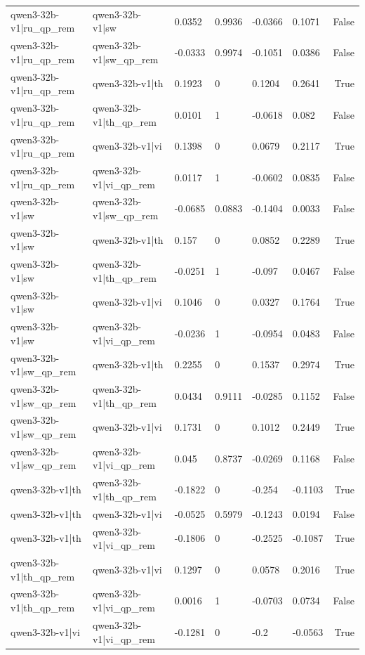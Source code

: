 \begin{table}
\begin{tabular}{llllllr}
qwen3-32b-v1|ru_qp_rem & qwen3-32b-v1|sw & 0.0352 & 0.9936 & -0.0366 & 0.1071 & False \\
qwen3-32b-v1|ru_qp_rem & qwen3-32b-v1|sw_qp_rem & -0.0333 & 0.9974 & -0.1051 & 0.0386 & False \\
qwen3-32b-v1|ru_qp_rem & qwen3-32b-v1|th & 0.1923 & 0 & 0.1204 & 0.2641 & True \\
qwen3-32b-v1|ru_qp_rem & qwen3-32b-v1|th_qp_rem & 0.0101 & 1 & -0.0618 & 0.082 & False \\
qwen3-32b-v1|ru_qp_rem & qwen3-32b-v1|vi & 0.1398 & 0 & 0.0679 & 0.2117 & True \\
qwen3-32b-v1|ru_qp_rem & qwen3-32b-v1|vi_qp_rem & 0.0117 & 1 & -0.0602 & 0.0835 & False \\
qwen3-32b-v1|sw & qwen3-32b-v1|sw_qp_rem & -0.0685 & 0.0883 & -0.1404 & 0.0033 & False \\
qwen3-32b-v1|sw & qwen3-32b-v1|th & 0.157 & 0 & 0.0852 & 0.2289 & True \\
qwen3-32b-v1|sw & qwen3-32b-v1|th_qp_rem & -0.0251 & 1 & -0.097 & 0.0467 & False \\
qwen3-32b-v1|sw & qwen3-32b-v1|vi & 0.1046 & 0 & 0.0327 & 0.1764 & True \\
qwen3-32b-v1|sw & qwen3-32b-v1|vi_qp_rem & -0.0236 & 1 & -0.0954 & 0.0483 & False \\
qwen3-32b-v1|sw_qp_rem & qwen3-32b-v1|th & 0.2255 & 0 & 0.1537 & 0.2974 & True \\
qwen3-32b-v1|sw_qp_rem & qwen3-32b-v1|th_qp_rem & 0.0434 & 0.9111 & -0.0285 & 0.1152 & False \\
qwen3-32b-v1|sw_qp_rem & qwen3-32b-v1|vi & 0.1731 & 0 & 0.1012 & 0.2449 & True \\
qwen3-32b-v1|sw_qp_rem & qwen3-32b-v1|vi_qp_rem & 0.045 & 0.8737 & -0.0269 & 0.1168 & False \\
qwen3-32b-v1|th & qwen3-32b-v1|th_qp_rem & -0.1822 & 0 & -0.254 & -0.1103 & True \\
qwen3-32b-v1|th & qwen3-32b-v1|vi & -0.0525 & 0.5979 & -0.1243 & 0.0194 & False \\
qwen3-32b-v1|th & qwen3-32b-v1|vi_qp_rem & -0.1806 & 0 & -0.2525 & -0.1087 & True \\
qwen3-32b-v1|th_qp_rem & qwen3-32b-v1|vi & 0.1297 & 0 & 0.0578 & 0.2016 & True \\
qwen3-32b-v1|th_qp_rem & qwen3-32b-v1|vi_qp_rem & 0.0016 & 1 & -0.0703 & 0.0734 & False \\
qwen3-32b-v1|vi & qwen3-32b-v1|vi_qp_rem & -0.1281 & 0 & -0.2 & -0.0563 & True \\
\bottomrule
\end{tabular}
\end{table}
